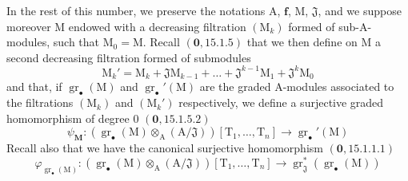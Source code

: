 \begin{env}[19.5.4]
\label{IV.19.5.4}
In the rest of this number, we preserve the notations $\mathrm{A}$, $\mathbf{f}$, $\mathrm{M}$, $\mathfrak{J}$, and we suppose moreover $\mathrm{M}$ endowed with a decreasing filtration $(\mathrm{M}_k)$ formed of sub-$\mathrm{A}$-modules, such that $\mathrm{M}_0=\mathrm{M}$. Recall $(\mathbf{0},15.1.5)$ that we then define on $\mathrm{M}$ a second decreasing filtration formed of submodules
\[
  \mathrm{M}_k'=\mathrm{M}_k+\mathfrak{J}\mathrm{M}_{k-1}+\ldots+\mathfrak{J}^{k-1}\mathrm{M}_1+\mathfrak{J}^k\mathrm{M}_0
\]
and that, if $\operatorname{gr}_\bullet(\mathrm{M})$ and $\operatorname{gr}_\bullet'(\mathrm{M})$ are the graded $\mathrm{A}$-modules associated to the filtrations $(\mathrm{M}_k)$ and $(\mathrm{M}_k')$ respectively, we define a surjective graded homomorphism of degree $0$ $(\mathbf{0},15.1.5.2)$
\[
  \psi_\mathbf{M}:(\operatorname{gr}_\bullet(\mathrm{M})\otimes_\mathrm{A}(\mathrm{A}/\mathfrak{J}))[\mathrm{T}_1,\ldots,\mathrm{T}_n]\to\operatorname{gr}_\bullet'(\mathrm{M})
\]
Recall also that we have the canonical surjective homomorphism $(\mathbf{0},15.1.1.1)$
\[
  \varphi_{\operatorname{gr}_\bullet(\mathrm{M})}:(\operatorname{gr}_\bullet(\mathrm{M})\otimes_\mathrm{A}(\mathrm{A}/\mathfrak{J}))[\mathrm{T}_1,\ldots,\mathrm{T}_n]\to\operatorname{gr}_\mathfrak{J}^*(\operatorname{gr}_\bullet(\mathrm{M}))
\]
\end{env}


